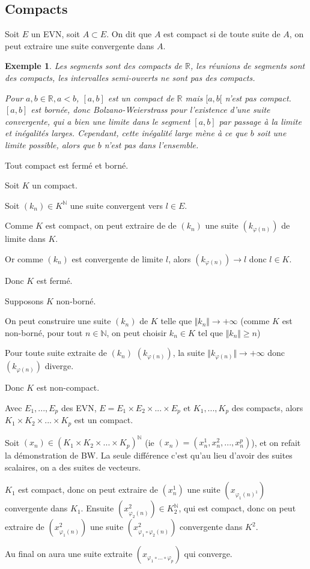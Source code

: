\documentclass[a4paper,12pt]{book}
\newcommand{\Def}[2]{\begin{tcolorbox}[sharp corners, colback=white,colframe=blue!90!black!75, title=Définition : #1]#2\end{tcolorbox}}
\newcommand{\Prop}[2]{\begin{tcolorbox}[sharp corners, colback=white,colframe=red!90!black!75, title=Proposition : #1]#2\end{tcolorbox}}
\newcommand{\Pre}[1]{\begin{tcolorbox}[sharp corners, colback=white,colframe=green!60!green!30!black!75, title=Preuve]#1\end{tcolorbox}}
\newtheorem{Exe}{Exemple}[section]
\def\R{\mathbb{R}}
\def\N{\mathbb{N}}
\begin{document}
\subsection{Compacts}
\Def{Compact}{Soit $E$ un EVN, soit $A\subset E$. On dit que $A$ est compact si de toute suite de $A$, on peut extraire une suite convergente dans $A$.}
\begin{Exe}
Les segments sont des compacts de $\R$, les réunions de segments sont des compacts, les intervalles semi-ouverts ne sont pas des compacts.
\par Pour $a,b\in\R, a<b$, $[a,b]$ est un compact de $\R$ mais $[a,b[$ n'est pas compact. $[a,b]$ est bornée, donc Bolzano-Weierstrass pour l'existence d'une suite convergente, qui a bien une limite dans le segment $[a,b]$ par passage à la limite et inégalités larges. Cependant, cette inégalité large mène à ce que $b$ soit une limite possible, alors que $b$ n'est pas dans l'ensemble.
\end{Exe}
\Prop{Fermeture du compact}{Tout compact est fermé et borné.}
\Pre{Soit $K$ un compact. \par Soit $(k_n)\in K^\N$ une suite convergent vers $l\in E$. \par Comme $K$ est compact, on peut extraire de de $(k_n)$ une suite $(k_{\varphi(n)})$ de limite dans $K$. \par Or comme $(k_n)$ est convergente de limite $l$, alors $(k_{\varphi(n)})\to l$ donc $l\in K$. \par Donc $K$ est fermé.
\par Supposons $K$ non-borné. \par On peut construire une suite $(k_n)$ de $K$ telle que $\Vert k_n\Vert\to+\infty$ (comme $K$ est non-borné, pour tout $n\in\N$, on peut choisir $k_n\in K$ tel que $\Vert k_n\Vert\geq n$) \par Pour toute suite extraite de $(k_n)$ $(k_{\varphi(n)})$, la suite $\Vert k_{\varphi(n)}\Vert\to+\infty$ donc $(k_{\varphi(n)})$ diverge. \par Donc $K$ est non-compact.}
\Prop{Produit cartésien de compacts}{Avec $E_1,..., E_p$ des EVN, $E=E_1\times E_2\times...\times E_p$ et $K_1,..., K_p$ des compacts, alors $K_1\times K_2\times...\times K_p$ est un compact.}
\Pre{Soit $(x_n)\in (K_1\times K_2\times...\times K_p)^\N$ (ie $(x_n)= (x^1_n, x^2_n,..., x^p_n)$), et on refait la démonstration de BW. La seule différence c'est qu'au lieu d'avoir des suites scalaires, on a des suites de vecteurs.
\par $K_1$ est compact, donc on peut extraire de $(x^1_n)$ une suite $(x_{\varphi_1(n)^1})$ convergente dans $K_1$. Ensuite $(x_{\varphi_2(n)}^2)\in K_2^\N$, qui est compact, donc on peut extraire de $(x_{\varphi_1(n)}^2)$ une suite $(x_{\varphi_1\circ\varphi_2(n)}^2)$ convergente dans $K^2$. \par Au final on aura une suite extraite $(x_{\varphi_1\circ...\circ\varphi_p})$ qui converge.}
\end{document}
